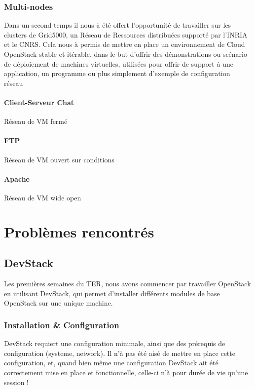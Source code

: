 \documentclass{report}
\begin{document}
        \subsection{Multi-nodes}
            Dans un second temps il nous à été offert l'opportunité de travailler sur les clusters
            de Grid5000, un Réseau de Ressources distribuées supporté par l'INRIA et le CNRS.\break
            Cela nous à permis de mettre en place un environnement de Cloud OpenStack stable et itérable, 
			dans le but d'offrir des démonstrations ou scénario de déploiement de machines virtuelles,
			utilisées pour offrir de support à une application, un programme ou plus simplement d'exemple de 
			configuration réseau~ 
			\subsubsection{Client-Serveur Chat}
			    Réseau de VM fermé
			\subsubsection{FTP}
				Réseau de VM ouvert sur conditions
			\subsubsection{Apache}
				Réseau de VM wide open

\chapter{Problèmes rencontrés}
    \section{DevStack}
        Les premières semaines du TER, nous avons commencer par travailler OpenStack en utilisant DevStack, 
        qui permet d'installer différents modules de base OpenStack sur une unique machine.
        \subsection{Installation & Configuration}
            DevStack requiert une configuration minimale, ainsi que des prérequis de configuration (systeme, 
            network).\break
            Il n'à pas été aisé de mettre en place cette configuration, et, quand bien même une configuration 
            DevStack ait été correctement mise en place et fonctionnelle, celle-ci n'à pour durée de vie qu'une session ! 
            
\end{document}
